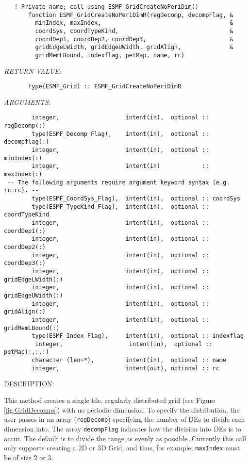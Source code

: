  
\begin{verbatim}   ! Private name; call using ESMF_GridCreateNoPeriDim()
       function ESMF_GridCreateNoPeriDimR(regDecomp, decompFlag, &
         minIndex, maxIndex,                                     &
         coordSys, coordTypeKind,                                &
         coordDep1, coordDep2, coordDep3,                        &
         gridEdgeLWidth, gridEdgeUWidth, gridAlign,              &
         gridMemLBound, indexflag, petMap, name, rc)
 \end{verbatim}{\em RETURN VALUE:}
\begin{verbatim}       type(ESMF_Grid) :: ESMF_GridCreateNoPeriDimR\end{verbatim}{\em ARGUMENTS:}
\begin{verbatim}        integer,                   intent(in),  optional :: regDecomp(:)
        type(ESMF_Decomp_Flag),    intent(in),  optional :: decompflag(:)
        integer,                   intent(in),  optional :: minIndex(:)
        integer,                   intent(in)            :: maxIndex(:)
 -- The following arguments require argument keyword syntax (e.g. rc=rc). --
        type(ESMF_CoordSys_Flag),  intent(in),  optional :: coordSys
        type(ESMF_TypeKind_Flag),  intent(in),  optional :: coordTypeKind
        integer,                   intent(in),  optional :: coordDep1(:)
        integer,                   intent(in),  optional :: coordDep2(:)
        integer,                   intent(in),  optional :: coordDep3(:)
        integer,                   intent(in),  optional :: gridEdgeLWidth(:)
        integer,                   intent(in),  optional :: gridEdgeUWidth(:)
        integer,                   intent(in),  optional :: gridAlign(:)
        integer,                   intent(in),  optional :: gridMemLBound(:)
        type(ESMF_Index_Flag),     intent(in),  optional :: indexflag
         integer,                   intent(in),  optional :: petMap(:,:,:)
        character (len=*),         intent(in),  optional :: name
        integer,                   intent(out), optional :: rc\end{verbatim}
{\sf DESCRIPTION:\\ }


  
   This method creates a single tile, regularly distributed grid
   (see Figure \ref{fig:GridDecomps}) with no periodic dimension.
   To specify the distribution, the user passes in an array
   ({\tt regDecomp}) specifying the number of DEs to divide each
   dimension into. The array {\tt decompFlag} indicates how the division into DEs is to
   occur.  The default is to divide the range as evenly as possible. Currently this call
   only supports creating a 2D or 3D Grid, and thus, for example, {\tt maxIndex} must be of size 2 or 3.
  
